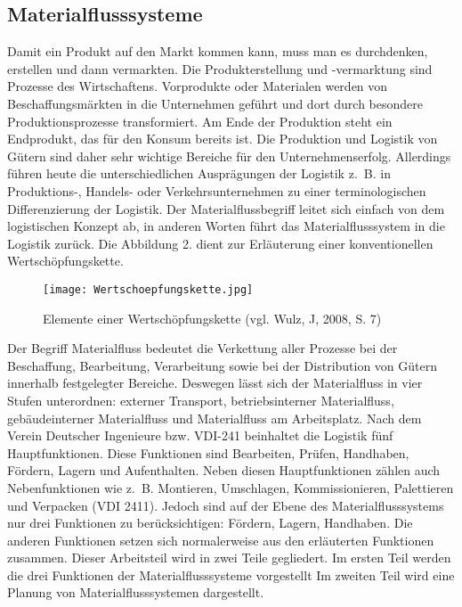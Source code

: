 \subsection{Materialflusssysteme}
Damit ein Produkt auf den Markt kommen kann, muss man es durchdenken, erstellen und dann vermarkten.
Die Produkterstellung und -vermarktung sind Prozesse des Wirtschaftens.
Vorprodukte oder Materialen werden von Beschaffungsm\"arkten in die Unternehmen gef\"uhrt und dort durch besondere Produktionsprozesse transformiert.
Am Ende der Produktion steht ein Endprodukt, das f\"ur den Konsum bereits ist. 
Die Produktion und Logistik von G\"utern sind daher sehr wichtige Bereiche f\"ur den Unternehmenserfolg.
Allerdings f\"uhren heute die unterschiedlichen Auspr\"agungen der Logistik z.~B. in Produktions-, Handels- oder Verkehrsunternehmen zu einer terminologischen Differenzierung der Logistik.
Der Materialflussbegriff leitet sich einfach von dem logistischen Konzept ab, in anderen Worten f\"uhrt das Materialflusssystem in die Logistik zur\"uck.
Die Abbildung 2. dient zur Erl\"auterung einer konventionellen Wertsch\"opfungskette. 
	\begin{figure}[h!]
		\centering
		\texttt{[image: Wertschoepfungskette.jpg]}
	\caption{Elemente einer Wertsch\"opfungskette (vgl. Wulz, J, 2008, S. 7)}
	\label{Wertschoepfungskette}
\end{figure}

Der Begriff Materialfluss bedeutet die Verkettung aller Prozesse bei der Beschaffung, Bearbeitung, Verarbeitung sowie bei der Distribution von G\"utern innerhalb festgelegter Bereiche.
Deswegen l\"asst sich der Materialfluss in vier Stufen unterordnen: externer Transport, betriebsinterner Materialfluss, geb\"audeinterner Materialfluss und Materialfluss am Arbeitsplatz.
Nach dem Verein Deutscher Ingenieure bzw. VDI-241 beinhaltet die Logistik f\"unf Hauptfunktionen.
Diese Funktionen sind Bearbeiten, Pr\"ufen, Handhaben, F\"ordern, Lagern und Aufenthalten.
Neben diesen Hauptfunktionen z\"ahlen auch Nebenfunktionen wie z.~B. Montieren, Umschlagen, Kommissionieren, Palettieren und Verpacken (VDI 2411).
Jedoch sind auf der Ebene des Materialflusssystems nur drei Funktionen zu ber\"ucksichtigen: F\"ordern, Lagern, Handhaben.
Die anderen Funktionen setzen sich normalerweise aus den erl\"auterten Funktionen zusammen.
Dieser Arbeitsteil wird in zwei Teile gegliedert.
Im ersten Teil werden die drei Funktionen der Materialflusssysteme vorgestellt Im zweiten Teil wird eine Planung von Materialflusssystemen dargestellt.

